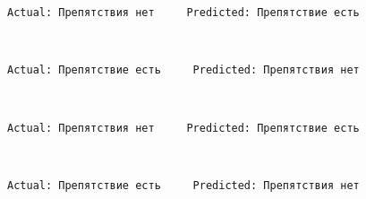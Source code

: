 \documentclass[11pt]{article}
\begin{document}
    \begin{Verbatim}[commandchars=\\\{\}]
Actual: Препятствия нет     Predicted: Препятствие есть

    \end{Verbatim}

    \begin{center}
    \end{center}
    { \hspace*{\fill} \\}
    
    \begin{Verbatim}[commandchars=\\\{\}]
Actual: Препятствие есть     Predicted: Препятствия нет

    \end{Verbatim}

    \begin{center}
    \end{center}
    { \hspace*{\fill} \\}
    
    \begin{Verbatim}[commandchars=\\\{\}]
Actual: Препятствия нет     Predicted: Препятствие есть

    \end{Verbatim}

    \begin{center}
    \end{center}
    { \hspace*{\fill} \\}
    
    \begin{Verbatim}[commandchars=\\\{\}]
Actual: Препятствие есть     Predicted: Препятствия нет

    \end{Verbatim}

    \begin{center}
    \end{center}
    { \hspace*{\fill} \\}
    
\end{document}
